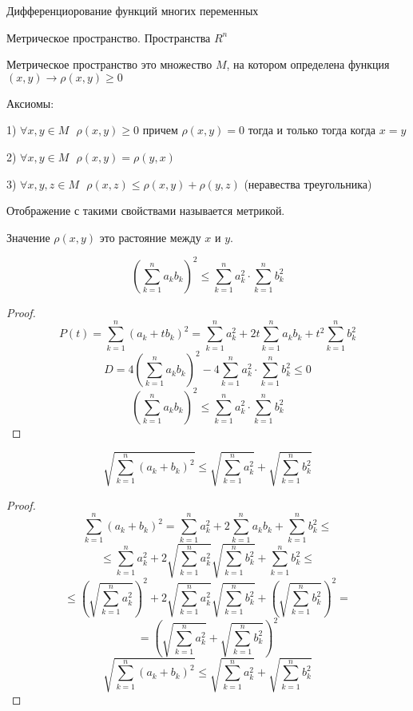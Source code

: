 \begin{title}
  Дифференциорование функций многих переменных
\end{title}

\begin{title}[\Large]
  Метрическое пространство. Пространства $R^n$
\end{title}

\begin{define}
  Метрическое пространство это множество $M$, на котором определена функция
  $(x, y) \to \rho(x, y) \ge 0$

  Аксиомы:

  1) $\forall x,y \in M ~~~ \rho(x,y) \ge 0$ причем $\rho(x,y) = 0$ тогда и
  только тогда когда $x = y$

  2) $\forall x,y \in M ~~~ \rho(x,y) =\rho(y,x)$

  3) $\forall x,y,z \in M ~~~ \rho(x,z) \le \rho(x,y) + \rho(y,z)$
  (неравества треугольника)

  Отображение с такими свойствами называется метрикой.

  Значение $\rho(x,y)$ это растояние между $x$ и $y$.
\end{define}

\begin{block}
  $$
  \left( \sum_{k=1}^n a_k b_k \right)^2 \le \sum_{k=1}^n a_k^2 \cdot
  \sum_{k=1}^n b_k^2
  $$
\end{block}

\begin{proof}
  $$
  P(t) = \sum_{k=1}^n (a_k + t b_k)^2 = \sum_{k=1}^n a_k^2 +
  2t\sum_{k=1}^n a_k b_k + t^2 \sum_{k=1}^n b_k^2
  $$
  $$
  D = 4\left( \sum_{k=1}^n a_k b_k \right)^2 - 4\sum_{k=1}^n a_k^2 \cdot
  \sum_{k=1}^n b_k^2 \le 0
  $$
  $$
  \left( \sum_{k=1}^n a_k b_k \right)^2 \le \sum_{k=1}^n a_k^2 \cdot
  \sum_{k=1}^n b_k^2
  $$
\end{proof}

\begin{block}
  $$
  \sqrt{\sum_{k=1}^n (a_k + b_k)^2} \le \sqrt{\sum_{k=1}^n a_k^2} +
  \sqrt{\sum_{k=1}^n b_k^2}
  $$
\end{block}

\begin{proof}
  $$
  \sum_{k=1}^n (a_k + b_k)^2 = \sum_{k=1}^n a_k^2 +
  2\sum_{k=1}^n a_k b_k + \sum_{k=1}^n b_k^2 \le
  $$
  $$
  \le \sum_{k=1}^n a_k^2 + 2\sqrt{\sum_{k=1}^n a_k^2} \sqrt{\sum_{k=1}^n b_k^2}
  + \sum_{k=1}^n b_k^2 \le
  $$
  $$
  \le \left( \sqrt{\sum_{k=1}^n a_k^2} \right)^2 + 2\sqrt{\sum_{k=1}^n a_k^2}
  \sqrt{\sum_{k=1}^n b_k^2} + \left( \sqrt{\sum_{k=1}^n b_k^2} \right)^2 =
  $$
  $$
  = \left( \sqrt{\sum_{k=1}^n a_k^2} + \sqrt{\sum_{k=1}^n b_k^2} \right)^2
  $$
  $$
  \sqrt{\sum_{k=1}^n (a_k + b_k)^2} \le \sqrt{\sum_{k=1}^n a_k^2} +
  \sqrt{\sum_{k=1}^n b_k^2}
  $$
\end{proof}

